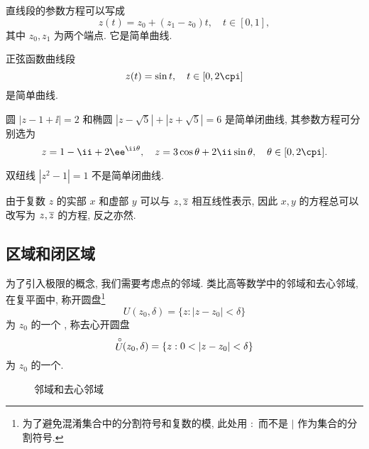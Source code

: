 \begin{exampleenum}
  \item 直线段的参数方程可以写成
  \[
    z(t)=z_0+(z_1-z_0)t,\quad t\in[0,1],
  \]
  其中 $z_0,z_1$ 为两个端点.
  它是简单曲线.
  \item 正弦函数曲线段
  \[
    z(t)=\sin t,\quad t\in[0,2\cpi]
  \]
  是简单曲线.
  \item 圆 $|z-1+\ii|=2$ 和椭圆 $|z-\sqrt5|+|z+\sqrt5|=6$ 是简单闭曲线, 其参数方程可分别选为
  \[
    z=1-\ii+2\ee^{\ii\theta},\quad
    z=3\cos\theta+2\ii\sin\theta,\quad
    \theta\in[0,2\cpi].
  \]
  \item 双纽线 $|z^2-1|=1$ 不是简单闭曲线.
\end{exampleenum}

由于复数 $z$ 的实部 $x$ 和虚部 $y$ 可以与 $z,\overline z$ 相互线性表示, 因此 $x,y$ 的方程总可以改写为 $z,\overline z$ 的方程, 反之亦然.


\subsection{区域和闭区域}

为了引入极限的概念, 我们需要考虑点的邻域.
类比高等数学中的邻域和去心邻域, 在复平面中, 称开圆盘\footnote{%
  为了避免混淆集合中的分割符号和复数的模, 此处用 $:$ 而不是 $\mid$ 作为集合的分割符号.%
}
\[
  U(z_0,\delta)=\{z:|z-z_0|<\delta\}
\]
为 $z_0$ 的一个 , 称去心开圆盘
\[
  \Uc(z_0,\delta)=\{z:0<|z-z_0|<\delta\}
\]
为 $z_0$ 的一个.

\begin{figure}[!htb]
  \centering
  \begin{minipage}{.4\textwidth}
    \centering
  \end{minipage}
  \begin{minipage}{.4\textwidth}
    \centering
  \end{minipage}
  \caption{邻域和去心邻域}
\end{figure}

